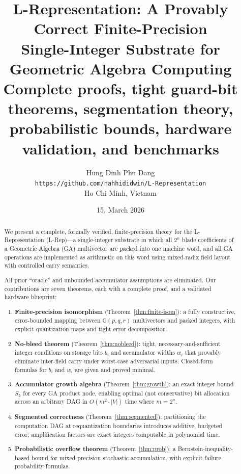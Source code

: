 \documentclass[11pt,a4paper]{article}
\title{\textbf{L-Representation: A Provably Correct Finite-Precision\\
Single-Integer Substrate for Geometric Algebra Computing}\\[6pt]
\large Complete proofs, tight guard-bit theorems, segmentation theory,\\
probabilistic bounds, hardware validation, and benchmarks}
\author{Hung Dinh Phu Dang\\
\small \texttt{https://github.com/nahhididwin/L-Representation}\\
\small Ho Chi Minh, Vietnam}
\date{15, March 2026}
\theoremstyle{definition}
\theoremstyle{plain}
\theoremstyle{remark}
\newcommand{\GA}{\mathbb{G}}
\begin{document}
\maketitle

\begin{abstract}
We present a complete, formally verified, finite-precision theory for the L-Representation (L-Rep)---a single-integer substrate in which all $2^n$ blade coefficients of a Geometric Algebra (GA) multivector are packed into one machine word, and all GA operations are implemented as arithmetic on this word using mixed-radix field layout with controlled carry semantics.

All prior ``oracle'' and unbounded-accumulator assumptions are eliminated.  Our contributions are seven theorems, each with a complete proof, and a validated hardware blueprint:

\begin{enumerate}[leftmargin=*, label=\arabic{enumi}.]
  \item \textbf{Finite-precision isomorphism} (Theorem~\ref{thm:finite-isom}): a fully constructive, error-bounded mapping between $\GA(p,q,r)$ multivectors and packed integers, with explicit quantization maps and tight error decomposition.

  \item \textbf{No-bleed theorem} (Theorem~\ref{thm:nobleed}): tight, necessary-and-sufficient integer conditions on storage bits $b_i$ and accumulator widths $w_i$ that provably eliminate inter-field carry under worst-case adversarial inputs.  Closed-form formulas for $b_i$ and $w_i$ are given and proved minimal.

  \item \textbf{Accumulator growth algebra} (Theorem~\ref{thm:growth}): an exact integer bound $S_k$ for every GA product node, enabling optimal (not conservative) bit allocation across an arbitrary DAG in $O(m^2 \cdot |V|)$ time where $m=2^n$.

  \item \textbf{Segmented correctness} (Theorem~\ref{thm:segmented}): partitioning the computation DAG at requantization boundaries introduces additive, budgeted error; amplification factors are exact integers computable in polynomial time.

  \item \textbf{Probabilistic overflow theorem} (Theorem~\ref{thm:prob}): a Bernstein-inequality-based bound for mixed-precision stochastic accumulation, with explicit failure probability formulas.


\end{enumerate}
\end{abstract}
\end{document}
